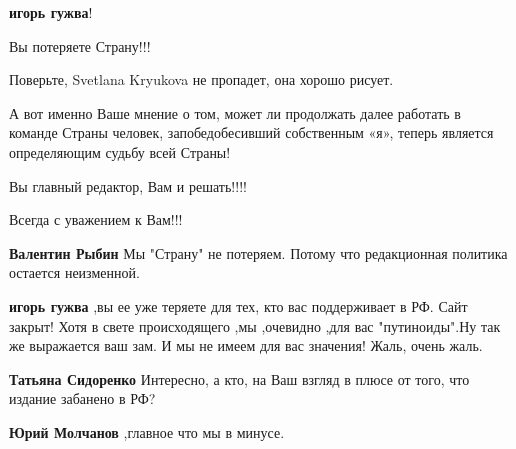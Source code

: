 \begin{itemize}
\textbf{игорь гужва}!

Вы потеряете Страну!!!

Поверьте, Svetlana Kryukova не пропадет, она хорошо рисует.

А вот именно Ваше мнение о том, может ли продолжать далее работать в команде
Страны человек, запобедобесивший собственным «я», теперь является определяющим
судьбу всей Страны!

Вы главный редактор, Вам и решать!!!!

Всегда с уважением к Вам!!!

\begin{itemize}

 
\textbf{Валентин Рыбин} Мы "Страну" не потеряем. Потому что редакционная политика остается неизменной.

 
\textbf{игорь гужва} ,вы ее уже теряете для тех, кто вас поддерживает в РФ.
Сайт закрыт! Хотя в свете происходящего ,мы ,очевидно ,для вас "путиноиды".Ну
так же выражается ваш зам. И мы не имеем для вас значения! Жаль, очень жаль.


\textbf{Татьяна Сидоренко} Интересно, а кто, на Ваш взгляд в плюсе от того, что издание забанено в РФ?

 
\textbf{Юрий Молчанов} ,главное что мы в минусе.


 

\end{itemize}
\end{itemize}
